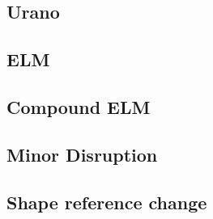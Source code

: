 \subsection{Urano}
\subsection{ELM}
\subsection{Compound ELM}
\subsection{Minor Disruption}
\subsection{Shape reference change}